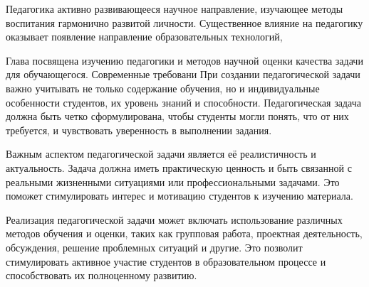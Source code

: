Педагогика активно развивающееся научное направление, изучающее методы воспитания гармонично развитой личности. 
Существенное влияние на педагогику оказывает появление направление образовательных технологий,

Глава посвящена изучению педагогики и методов научной оценки качества задачи для обучающегося. Современные требовани
При создании педагогической задачи важно учитывать не только содержание обучения, но и индивидуальные особенности студентов, их уровень знаний и способности. Педагогическая задача должна быть четко сформулирована, чтобы студенты могли понять, что от них требуется, и чувствовать уверенность в выполнении задания.

Важным аспектом педагогической задачи является её реалистичность и актуальность. Задача должна иметь практическую ценность и быть связанной с реальными жизненными ситуациями или профессиональными задачами. Это поможет стимулировать интерес и мотивацию студентов к изучению материала.



Реализация педагогической задачи может включать использование различных методов обучения и оценки, таких как групповая работа, проектная деятельность, обсуждения, решение проблемных ситуаций и другие. Это позволит стимулировать активное участие студентов в образовательном процессе и способствовать их полноценному развитию.

 